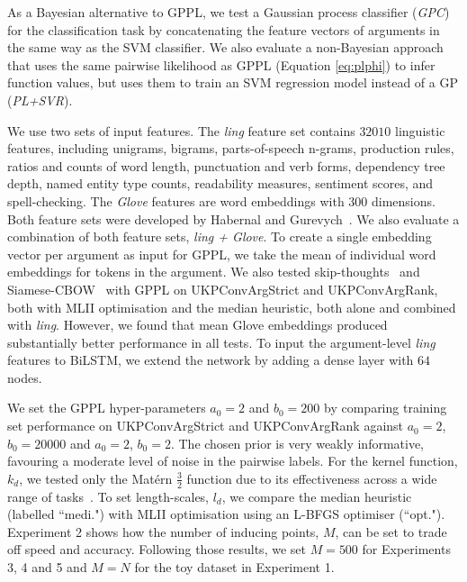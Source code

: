 



As a Bayesian alternative to GPPL, 
we test a Gaussian process classifier (\emph{GPC}) for the classification task 
by concatenating the feature vectors of arguments in the same way as the SVM classifier.
We also evaluate a non-Bayesian approach that uses the same pairwise likelihood as GPPL
(Equation \ref{eq:plphi}) to infer function values, 
but uses them to train an SVM regression model instead of a GP (\emph{PL+SVR}).

We use two sets of input features. The \emph{ling} feature set contains $32010$ linguistic features,  
including unigrams, bigrams, parts-of-speech n-grams, production rules,
ratios and counts of word length, punctuation and verb forms,
dependency tree depth, named entity type counts,
readability measures, sentiment scores, and spell-checking.
The \emph{Glove} features are word embeddings with 300 dimensions. Both feature sets were
developed by Habernal and Gurevych~.
We also evaluate a combination of both feature sets, \emph{ling + Glove}.
To create a single embedding vector per argument as input for GPPL,
we take the mean of individual word embeddings for tokens in the argument.
We also tested skip-thoughts~\cite{kiros2015skip} and Siamese-CBOW~\cite{kenter2016siamesecbow} 
with GPPL on UKPConvArgStrict and UKPConvArgRank, both with MLII optimisation and the median heuristic,
 both alone and combined with \emph{ling}. 
However, we found that mean Glove embeddings produced substantially better performance in all tests.
To input the argument-level \emph{ling} features to BiLSTM, we extend the network by adding a dense layer with $64$ nodes. 

We set the GPPL hyper-parameters $a_0=2$ and $b_0=200$ by comparing
training set performance on UKPConvArgStrict and UKPConvArgRank against $a_0=2$, $b_0=20000$ and $a_0=2$, $b_0=2$.
The chosen prior is very weakly informative, favouring a moderate level of noise in the pairwise labels.
For the kernel function, $k_d$, we tested only the 
Mat\'ern $\frac{3}{2}$ function due to its 
effectiveness across a wide range of tasks~\cite{rasmussen_gaussian_2006}.
To set length-scales, $l_d$, we compare the median heuristic (labelled ``medi.")
with MLII optimisation using an L-BFGS optimiser (``opt."). Experiment 2 shows how
the number of inducing points, $M$, can be set to trade off speed and accuracy. 
Following those results, we set $M=500$ for Experiments 3, 4 and 5 and $M=N$ for the toy dataset in Experiment 1.

